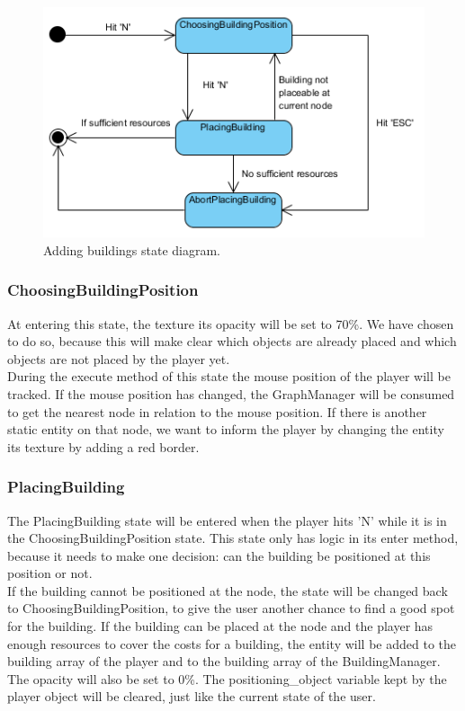 \begin{figure}[!htb]
    \centering
    \includegraphics{res/adding-buildings/States-StateDiagram.png}
    \caption{Adding buildings state diagram.}\label{fig:statediagram-addingbuildings}
\end{figure}

\subsubsection{ChoosingBuildingPosition}
At entering this state, the texture its opacity will be set to 70\%. We have chosen to do so, because this will make clear which objects are already placed and which objects are not placed by the player yet.\\
During the execute method of this state the mouse position of the player will be tracked. If the mouse position has changed, the GraphManager will be consumed to get the nearest node in relation to the mouse position. If there is another static entity on that node, we want to inform the player by changing the entity its texture by adding a red border.

\subsubsection{PlacingBuilding}
The PlacingBuilding state will be entered when the player hits 'N' while it is in the ChoosingBuildingPosition state. This state only has logic in its enter method, because it needs to make one decision: can the building be positioned at this position or not.\\
If the building cannot be positioned at the node, the state will be changed back to ChoosingBuildingPosition, to give the user another chance to find a good spot for the building. If the building can be placed at the node and the player has enough resources to cover the costs for a building, the entity will be added to the building array of the player and to the building array of the BuildingManager. The opacity will also be set to 0\%. The positioning\_object variable kept by the player object will be cleared, just like the current state of the user.

